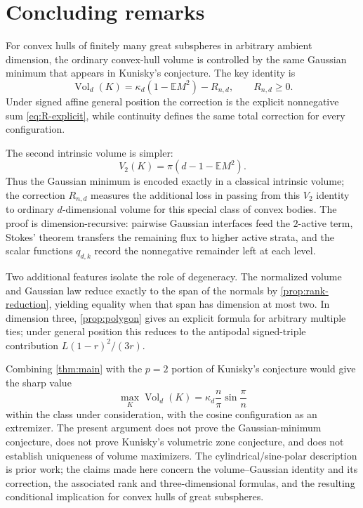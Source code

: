\documentclass[10pt,reqno]{amsart}
\theoremstyle{definition}
\theoremstyle{remark}
\newcommand{\E}{\mathbb E}
\newcommand{\Vol}{\operatorname{Vol}}
\begin{document}
\section{Concluding remarks}\label{sec:conclusion}
For convex hulls of finitely many great subspheres in arbitrary ambient dimension, the ordinary convex-hull volume is controlled by the same Gaussian minimum that appears in Kunisky's conjecture. The key identity is
\[
\Vol_d(K)=\kappa_d(1-\E M^2)-R_{n,d},\qquad R_{n,d}\ge0.
\]
Under signed affine general position the correction is the explicit nonnegative sum \eqref{eq:R-explicit}, while continuity defines the same total correction for every configuration.

The second intrinsic volume is simpler:
\[
V_2(K)=\pi(d-1-\E M^2).
\]
Thus the Gaussian minimum is encoded exactly in a classical intrinsic volume; the correction $R_{n,d}$ measures the additional loss in passing from this $V_2$ identity to ordinary $d$-dimensional volume for this special class of convex bodies. The proof is dimension-recursive: pairwise Gaussian interfaces feed the $2$-active term, Stokes' theorem transfers the remaining flux to higher active strata, and the scalar functions $q_{d,k}$ record the nonnegative remainder left at each level.

Two additional features isolate the role of degeneracy. The normalized volume and Gaussian law reduce exactly to the span of the normals by \cref{prop:rank-reduction}, yielding equality when that span has dimension at most two. In dimension three, \cref{prop:polygon} gives an explicit formula for arbitrary multiple ties; under general position this reduces to the antipodal signed-triple contribution $L(1-r)^2/(3r)$.

Combining \cref{thm:main} with the $p=2$ portion of Kunisky's conjecture would give the sharp value
\[
\max_K\Vol_d(K)=\kappa_d\frac n\pi\sin\frac\pi n
\]
within the class under consideration, with the cosine configuration as an extremizer. The present argument does not prove the Gaussian-minimum conjecture, does not prove Kunisky's volumetric zone conjecture, and does not establish uniqueness of volume maximizers. The cylindrical/sine-polar description is prior work; the claims made here concern the volume--Gaussian identity and its correction, the associated rank and three-dimensional formulas, and the resulting conditional implication for convex hulls of great subspheres.
\end{document}
